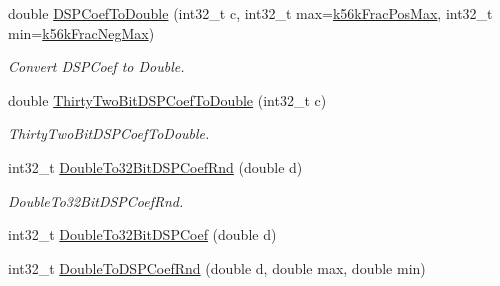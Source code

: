 \begin{DoxyCompactItemize}
double \hyperlink{a00181_a5e9c399a10a03718eaaf71cfcddd583f}{D\+S\+P\+Coef\+To\+Double} (int32\+\_\+t c, int32\+\_\+t max=\hyperlink{a00181_aa1f75eeb19dad78b3045cb5778421b61}{k56k\+Frac\+Pos\+Max}, int32\+\_\+t min=\hyperlink{a00181_a3306ddeeab535815290a268837e276b1}{k56k\+Frac\+Neg\+Max})
\begin{DoxyCompactList}\small\item\em Convert D\+S\+P\+Coef to Double. \end{DoxyCompactList}\item 
double \hyperlink{a00181_a52514266bf44c844934aedcd6975037d}{Thirty\+Two\+Bit\+D\+S\+P\+Coef\+To\+Double} (int32\+\_\+t c)
\begin{DoxyCompactList}\small\item\em Thirty\+Two\+Bit\+D\+S\+P\+Coef\+To\+Double. \end{DoxyCompactList}\item 
int32\+\_\+t \hyperlink{a00181_ab8477bacb0294598f49057507fb17810}{Double\+To32\+Bit\+D\+S\+P\+Coef\+Rnd} (double d)
\begin{DoxyCompactList}\small\item\em Double\+To32\+Bit\+D\+S\+P\+Coef\+Rnd. \end{DoxyCompactList}\item 
int32\+\_\+t \hyperlink{a00181_ac7d80281cdc671669f3f2d523b2960cf}{Double\+To32\+Bit\+D\+S\+P\+Coef} (double d)
\item 
int32\+\_\+t \hyperlink{a00181_a3db78a10d239924fd403b9d2fed5b296}{Double\+To\+D\+S\+P\+Coef\+Rnd} (double d, double max, double min)
\end{DoxyCompactItemize}
